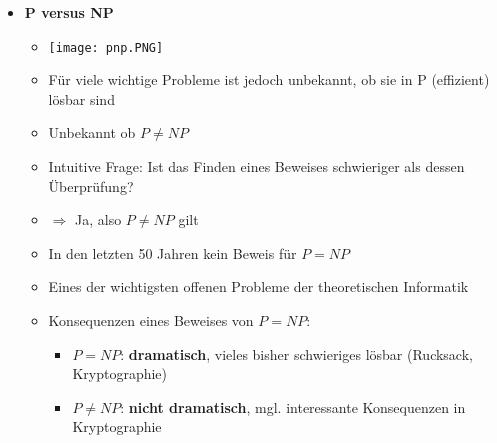 \begin{itemize}
            \item \textbf{P versus NP}
                \begin{itemize}
                    \item[] \texttt{[image: pnp.PNG]}
                    \item Für viele wichtige Probleme ist jedoch unbekannt, ob sie in P (effizient) lösbar sind
                    \item Unbekannt ob $P \neq NP$
                    \item Intuitive Frage: Ist das Finden eines Beweises schwieriger als dessen Überprüfung?
                    \item[] $\Rightarrow$ Ja, also $P \neq NP$ gilt
                    \item In den letzten 50 Jahren kein Beweis für $P = NP$
                    \item Eines der wichtigsten offenen Probleme der theoretischen Informatik
                    \item Konsequenzen eines Beweises von $P=NP$:
                        \begin{itemize}
                            \item $P=NP$: \textbf{dramatisch}, vieles bisher schwieriges lösbar (Rucksack, Kryptographie)
                            \item $P\neq NP$: \textbf{nicht dramatisch}, mgl. interessante Konsequenzen in Kryptographie
                        \end{itemize}
                \end{itemize}


\end{itemize}
